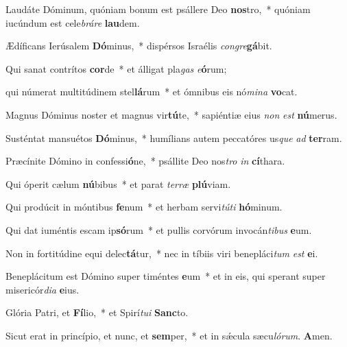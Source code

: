 \item Laudáte Dóminum, quóniam bonum est psállere Deo \textbf{nos}tro,~* quóniam iucúndum est cele\textit{bráre} \textbf{lau}dem.

\item Ædíficans Ierúsalem \textbf{Dó}minus,~* dispérsos Israélis \textit{congre}\textbf{gá}bit.

\item Qui sanat contrítos \textbf{cor}de~* et álligat pla\textit{gas} \textit{e}\textbf{ó}rum;

\item qui númerat multitúdinem stel\textbf{lá}rum~* et ómnibus eis nó\textit{mina} \textbf{vo}cat.

\item Magnus Dóminus noster et magnus vir\textbf{tú}te,~* sapiéntiæ eius \textit{non} \textit{est} \textbf{nú}merus.

\item Susténtat mansuétos \textbf{Dó}minus,~* humílians autem peccatóres us\textit{que} \textit{ad} \textbf{ter}ram.

\item Præcínite Dómino in confessi\textbf{ó}ne,~* psállite Deo nos\textit{tro} \textit{in} \textbf{cí}thara.

\item Qui óperit cælum \textbf{nú}bibus~* et parat \textit{terræ} \textbf{plú}viam.

\item Qui prodúcit in móntibus \textbf{fe}num~* et herbam servi\textit{túti} \textbf{hó}minum.

\item Qui dat iuméntis escam ip\textbf{só}rum~* et pullis corvórum invocán\textit{tibus} \textbf{e}um.

\item Non in fortitúdine equi delec\textbf{tá}tur,~* nec in tíbiis viri benepláci\textit{tum} \textit{est} \textbf{e}i.

\item Beneplácitum est Dómino super timéntes \textbf{e}um~* et in eis, qui sperant super misericór\textit{dia} \textbf{e}ius.

\item Glória Patri, et \textbf{Fí}lio,~* et Spirí\textit{tui} \textbf{Sanc}to.

\item Sicut erat in princípio, et nunc, et \textbf{sem}per,~* et in sǽcula sæcu\textit{lórum}. \textbf{A}men.